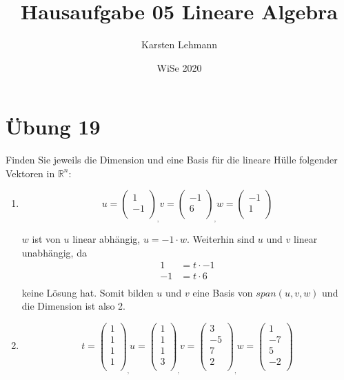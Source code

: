 \documentclass{article}
\author{Karsten Lehmann}
\date{WiSe 2020}
\title{Hausaufgabe 05 Lineare Algebra}
\begin{document}
\section*{Übung 19}

Finden Sie jeweils die Dimension und eine Basis für die lineare Hülle folgender Vektoren in $\mathbb{R}^n$:

\begin{enumerate}[i]
\item
  \[
    u = \begin{pmatrix}
      1  \\
      -1 \\
    \end{pmatrix}_,
    v = \begin{pmatrix}
      -1 \\
      6  \\
    \end{pmatrix}_,
    w = \begin{pmatrix}
      -1 \\
      1  \\
    \end{pmatrix}
  \]
  
  $w$ ist von $u$ linear abhängig, $u = -1 \cdot w$. Weiterhin sind $u$ und $v$ linear unabhängig, da
  \begin{align*}
    1  &= t \cdot -1 \\
    -1 &= t \cdot 6  \\
  \end{align*}
  keine Lösung hat. Somit bilden $u$ und $v$ eine Basis von $span(u, v, w)$ und die Dimension ist also 2.
  
\item
  \[
    t = \begin{pmatrix}
      1 \\
      1 \\
      1 \\
      1 \\
    \end{pmatrix}_,
    u =\begin{pmatrix}
      1 \\
      1 \\
      1 \\
      3 \\
    \end{pmatrix}_,
    v = \begin{pmatrix}
      3  \\
      -5 \\
      7  \\
      2  \\
    \end{pmatrix}_,
    w = \begin{pmatrix}
      1  \\
      -7 \\
      5  \\
      -2 \\
    \end{pmatrix}
  \]  


\end{enumerate}
\end{document}
